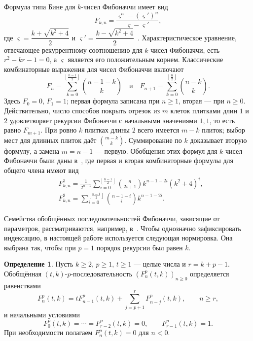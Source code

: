\documentclass[a4paper,14pt]{extreport}
\theoremstyle{plain}
\theoremstyle{definition}
\newtheorem{definition}{Определение}[section]
\theoremstyle{remark}
\begin{document}
Формула типа Бине для $k$-чисел Фибоначчи имеет вид
\begin{equation}
	F_{k,n} = \frac{\varsigma^n - (\varsigma')^n}{\varsigma - \varsigma'},
\end{equation}
где $\varsigma = \dfrac{k + \sqrt{k^2 + 4}}{2}$ и $\varsigma' = \dfrac{k - \sqrt{k^2 + 4}}{2}$~\cite{Falcon2007Plaza,Falcon2007PlazaSeco}. Характеристическое уравнение, отвечающее рекуррентному соотношению для $k$-чисел Фибоначчи, есть $r^2 - kr - 1 = 0$, а $\varsigma$ является его положительным корнем. Классические комбинаторные выражения для чисел Фибоначчи включают
\begin{equation}
	F_n = \sum_{k=0}^{\left\lfloor \frac{n-1}{2} \right\rfloor} \binom{n-1-k}{k}
	\quad\text{и}\quad
	F_{n+1} = \sum_{k=0}^{\left\lfloor \frac{n}{2} \right\rfloor} \binom{n-k}{k}.
\end{equation}
Здесь $F_0=0$, $F_1=1$; первая формула записана при $n\ge1$,
вторая --- при $n\ge0$.
Действительно, число способов покрыть отрезок из $m$ клеток
плитками длин $1$ и $2$ удовлетворяет рекурсии Фибоначчи
с начальными значениями $1,1$, то есть равно $F_{m+1}$.
При ровно $k$ плитках длины $2$ всего имеется $m-k$ плиток;
выбор мест для длинных плиток даёт $\binom{m-k}{k}$.
Суммирование по $k$ доказывает вторую формулу, а замена $m=n-1$
--- первую.
Обобщения этих формул для $k$-чисел Фибоначчи были даны в~\cite{Falcon2007PlazaThird}, где первая и вторая комбинаторные формулы для общего члена имеют вид
\begin{align}
	&	F^{1}_{k,n}
	= \frac{1}{2^{n-1}} \sum_{i=0}^{\left\lfloor \frac{n-1}{2} \right\rfloor}
	\binom{n}{2i+1} k^{ n-1-2i} (k^2+4)^i,\label{eq1pirl}\\
	&	F^{2}_{k,n}
	= \sum_{i=0}^{\left\lfloor \frac{n-1}{2} \right\rfloor}
	\binom{n-1-i}{i} k^{ n-1-2i}.\label{eq1pirl00}
\end{align}


Семейства обобщённых последовательностей Фибоначчи, зависящие
от параметров, рассматриваются, например, в~\cite{Mehraban2006Gulliver}.
Чтобы однозначно зафиксировать индексацию, в настоящей работе
используется следующая нормировка. Она выбрана так, чтобы при $p=1$
порядок рекурсии был равен $k$.

\begin{definition}\label{defn1pil}
Пусть $k\ge2$, $p\ge1$, $t\ge1$ --- целые числа и $r=k+p-1$.
Обобщённая $(t,k)$-$p$-последовательность
$(F_n^p(t,k))_{n\ge0}$ определяется равенствами
\begin{equation}
 F_n^p(t,k)=tF_{n-1}^p(t,k)
       +\sum_{j=p+1}^{r}F_{n-j}^p(t,k),
 \qquad n\ge r,
\end{equation}
и начальными условиями
\begin{equation}
 F_0^p(t,k)=\cdots=F_{r-2}^p(t,k)=0,
 \qquad F_{r-1}^p(t,k)=1.
\end{equation}
При необходимости полагаем $F_n^p(t,k)=0$ для $n<0$.
\end{definition}
\end{document}
